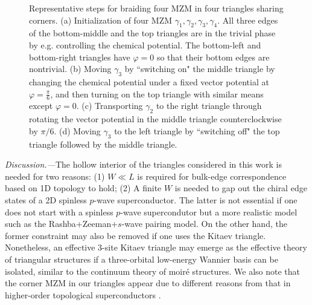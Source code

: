 \documentclass[aps,prb,twocolumn,showpacs,amsmath,amssymb,superscriptaddress]{revtex4-2}
\begin{document}
\begin{figure}[ht]
  \caption{Representative steps for braiding four MZM in four triangles sharing corners. (a) Initialization of four MZM $\gamma_1, \gamma_2, \gamma_3, \gamma_4$. All three edges of the bottom-middle and the top triangles are in the trivial phase by e.g. controlling the chemical potential. The bottom-left and bottom-right triangles have $\varphi = 0$ so that their bottom edges are nontrivial. (b) Moving $\gamma_3$ by ``switching on" the middle triangle by changing the chemical potential under a fixed vector potential at $\varphi=\frac{\pi}{6}$, and then turning on the top triangle with similar means except $\varphi = 0$. (c) Transporting $\gamma_2$ to the right triangle through rotating the vector potential in the middle triangle counterclockwise by $\pi/6$. (d) Moving $\gamma_3$ to the left triangle by ``switching off" the top triangle followed by the middle triangle.}
  \label{fig:4MZMbraiding}
\end{figure}

\emph{Discussion.---}The hollow interior of the triangles considered in this work is needed for two reasons: (1) $W\ll L$ is required for bulk-edge correspondence based on 1D topology to hold; (2) A finite $W$ is needed to gap out the chiral edge states of a 2D spinless $p$-wave superconductor. The latter is not essential if one does not start with a spinless $p$-wave supercondutor but a more realistic model such as the Rashba+Zeeman+$s$-wave pairing model. On the other hand, the former constraint may also be removed if one uses the Kitaev triangle. Nonetheless, an effective 3-site Kitaev triangle may emerge as the effective theory of triangular structures if a three-orbital low-energy Wannier basis can be isolated, similar to the continuum theory of moir\'{e} structures. We also note that the corner MZM in our triangles appear due to different reasons from that in higher-order topological superconductors \cite{wangEvidenceMajoranaBound2018,pahomiBraidingMajoranaCorner2020,zhangsb_2020_1,zhangsb_2020_2}.
\end{document}
